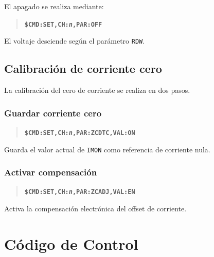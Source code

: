 \documentclass{article}
\begin{document}
El apagado se realiza mediante:

\begin{quote}
\textbf{\texttt{\$CMD:SET,CH:\emph{n},PAR:OFF}}
\end{quote}

El voltaje desciende según el parámetro \texttt{RDW}.

\subsection{Calibración de corriente cero}

La calibración del cero de corriente se realiza en dos pasos.

\subsubsection{Guardar corriente cero}

\begin{quote}
\textbf{\texttt{\$CMD:SET,CH:\emph{n},PAR:ZCDTC,VAL:ON}}
\end{quote}

Guarda el valor actual de \texttt{IMON} como referencia de corriente nula.

\subsubsection{Activar compensación}

\begin{quote}
\textbf{\texttt{\$CMD:SET,CH:\emph{n},PAR:ZCADJ,VAL:EN}}
\end{quote}

Activa la compensación electrónica del offset de corriente.


\section{Código de Control}
\end{document}
